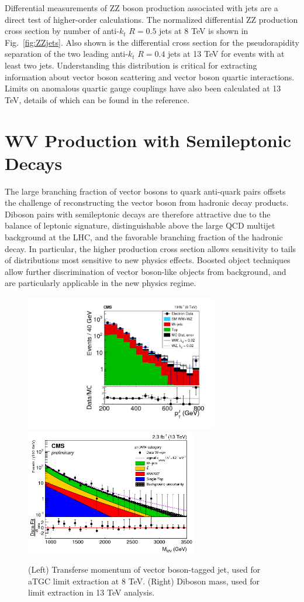 \documentclass[10pt]{article}
\begin{document}
Differential measurements of ZZ boson production associated with jets are
a direct test of higher-order calculations. The normalized differential 
ZZ production cross section by number of anti-$k_{t}$ $R=0.5$ jets 
at 8 TeV is shown in Fig.~\ref{fig:ZZjets}. Also shown is the differential
cross section for the pseudorapidity separation of the two leading
anti-$k_{t}$ $R=0.4$ jets at 13 TeV for events with at least two jets.
Understanding this distribution is critical for extracting information
about vector boson scattering and vector boson quartic interactions.
Limits on anomalous quartic gauge couplings have also been calculated at 13 TeV, 
details of which can be found in the reference.

\section{WV Production with Semileptonic Decays}

The large branching fraction 
of vector bosons to quark anti-quark pairs offsets
the challenge of reconstructing the vector boson from
hadronic decay products. Diboson pairs with semileptonic decays
are therefore attractive due to the balance of leptonic signature, 
distinguishable above the large QCD multijet background at the LHC,
and the favorable branching fraction of the hadronic decay.
In particular, the higher production cross section
allows sensitivity to tails of distributions most sensitive to new physics
effects. Boosted object techniques allow further discrimination of
vector boson-like objects from background, and are particularly applicable
in the new physics regime.

\begin{figure}[htb]
  \centering
    \includegraphics[height=2.35in]{figures/WV8TeV_ptJ_aC.png}
    \includegraphics[height=2.15in]{figures/WV13TeV_mWW_aC.png}
  \caption{(Left) Transferse momentum of vector boson-tagged jet, used for
    aTGC limit extraction at 8 TeV. (Right) Diboson mass, used for limit
    extraction in 13 TeV analysis. }
  \label{fig:WV}
\end{figure}
\end{document}
